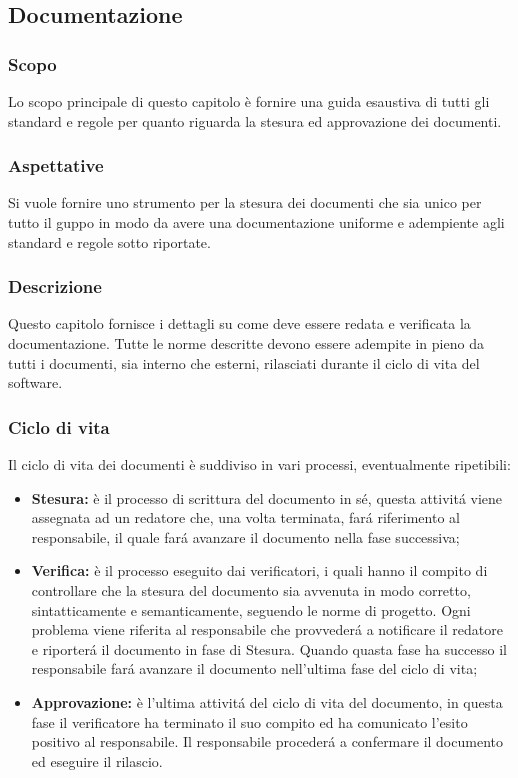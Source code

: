 \subsection{Documentazione}

		\subsubsection{Scopo}
			Lo scopo principale di questo capitolo è fornire una guida esaustiva di tutti gli standard e regole per quanto riguarda la stesura ed approvazione dei documenti.
		\subsubsection{Aspettative}
			Si vuole fornire uno strumento per la stesura dei documenti che sia unico per tutto il guppo in modo da avere una documentazione uniforme e adempiente agli standard e regole sotto riportate.
		\subsubsection{Descrizione}
			Questo capitolo fornisce i dettagli su come deve essere redata e verificata la documentazione. Tutte le norme descritte devono essere adempite in pieno da tutti i documenti, sia interno che esterni, rilasciati durante il ciclo di vita del software.
		\subsubsection{Ciclo di vita}
			Il ciclo di vita dei documenti è suddiviso in vari processi, eventualmente ripetibili:
			\begin{itemize}
				\item \textbf{Stesura:} è il processo di scrittura del documento in sé, questa attivitá viene assegnata ad un redatore che, una volta terminata, fará riferimento al responsabile, il quale fará avanzare il documento nella fase successiva;
				\item \textbf{Verifica:} è il processo eseguito dai verificatori, i quali hanno il compito di controllare che la stesura del documento sia avvenuta in modo corretto, sintatticamente e semanticamente, seguendo le norme di progetto. Ogni problema viene riferita al responsabile che provvederá a notificare il redatore e riporterá il documento in fase di Stesura. Quando quasta fase ha successo il responsabile fará avanzare il documento nell'ultima fase del ciclo di vita;
				\item \textbf{Approvazione:} è l'ultima attivitá del ciclo di vita del documento, in questa fase il verificatore ha terminato il suo compito ed ha comunicato l'esito positivo al responsabile. Il responsabile procederá a confermare il documento ed eseguire il rilascio.
			\end{itemize}

